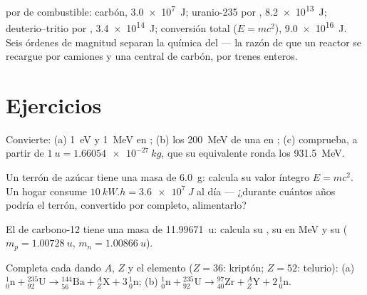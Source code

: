 \begin{example}\label{ex:g12:nuclear-energy:ladder}
 por  de combustible: carbón, \qty{3.0e7}{J}; uranio-235 por ,
\qty{8.2e13}{J}; deuterio--tritio por , \qty{3.4e14}{J}; conversión total
($E = mc^2$), \qty{9.0e16}{J}. Seis órdenes de magnitud separan la química del 
--- la razón de que un reactor se recargue por camiones y una central de carbón, por
trenes enteros.
\end{example}

\section{Ejercicios}

\begin{exercise}[$\star$]\label{exo:g12:nuclear-energy:1}
Convierte: (a) \qty{1}{eV} y \qty{1}{MeV} en ; (b) los \qty{200}{MeV} de una
 en ; (c) comprueba, a partir de
$\qty{1}{u} = \qty{1.66054e-27}{kg}$, que su  equivalente ronda los
\qty{931.5}{MeV}.
\end{exercise}

\begin{exercise}[$\star$]\label{exo:g12:nuclear-energy:2}
Un terrón de azúcar tiene una masa de \qty{6.0}{g}: calcula su valor íntegro
$E = mc^2$. Un hogar consume $\qty{10}{kW.h} = \qty{3.6e7}{J}$ al día --- ¿durante
cuántos años podría el terrón, convertido por completo, alimentarlo?
\end{exercise}

\begin{exercise}[$\star$]\label{exo:g12:nuclear-energy:3}
El  de carbono-12 tiene una masa de \qty{11.99671}{u}: calcula su , su  en \unit{MeV} y su 
($m_p = \qty{1.00728}{u}$, $m_n = \qty{1.00866}{u}$).
\end{exercise}

\begin{exercise}[$\star$]\label{exo:g12:nuclear-energy:4}
Completa cada  dando $A$, $Z$ y el elemento ($Z = 36$: kriptón; $Z = 52$:
telurio):
(a) ${}^{1}_{0}\mathrm{n} + {}^{235}_{92}\mathrm{U} \to
{}^{144}_{56}\mathrm{Ba} + {}^{A}_{Z}\mathrm{X} + 3\,{}^{1}_{0}\mathrm{n}$;
(b) ${}^{1}_{0}\mathrm{n} + {}^{235}_{92}\mathrm{U} \to
{}^{97}_{40}\mathrm{Zr} + {}^{A}_{Z}\mathrm{Y} + 2\,{}^{1}_{0}\mathrm{n}$.
\end{exercise}

